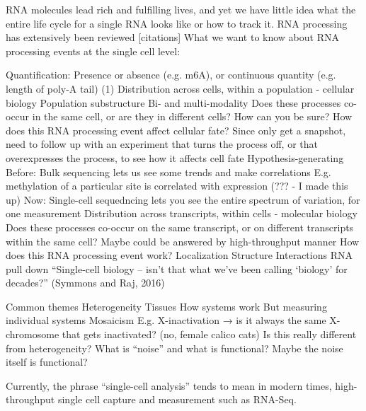 RNA molecules lead rich and fulfilling lives, and yet we have little idea what the entire life cycle for a single RNA looks like or how to track it.
RNA processing has extensively been reviewed [citations]
What we want to know about RNA processing events at the single cell level:


Quantification: Presence or absence (e.g. m6A), or continuous quantity (e.g. length of poly-A tail)
(1) Distribution across cells, within a population - cellular biology
Population substructure 
Bi- and multi-modality
Does these processes co-occur in the same cell, or are they in different cells?
How can you be sure?
How does this RNA processing event affect cellular fate?
Since only get a snapshot, need to follow up with an experiment that turns the process off, or that overexpresses the process, to see how it affects cell fate
Hypothesis-generating
Before:
Bulk sequencing lets us see some trends and make correlations
E.g. methylation of a particular site is correlated with expression (??? - I made this up)
Now:
Single-cell sequedncing lets you see the entire spectrum of variation, for one measurement
Distribution across transcripts, within cells - molecular biology
Does these processes co-occur on the same transcript, or on different transcripts within the same cell?
Maybe could be answered by high-throughput manner
How does this RNA processing event work?
Localization
Structure
Interactions
RNA pull down
“Single-cell biology -- isn’t that what we’ve been calling ‘biology’ for decades?” (Symmons and Raj, 2016)

Common themes
Heterogeneity
Tissues
How systems work
But measuring individual systems
Mosaicism
E.g. X-inactivation → is it always the same X-chromosome that gets inactivated? (no, female calico cats)
Is this really different from heterogeneity?
What is “noise” and what is functional? Maybe the noise itself is functional?

Currently, the phrase “single-cell analysis” tends to mean in modern times, high-throughput single cell capture and measurement such as RNA-Seq.


